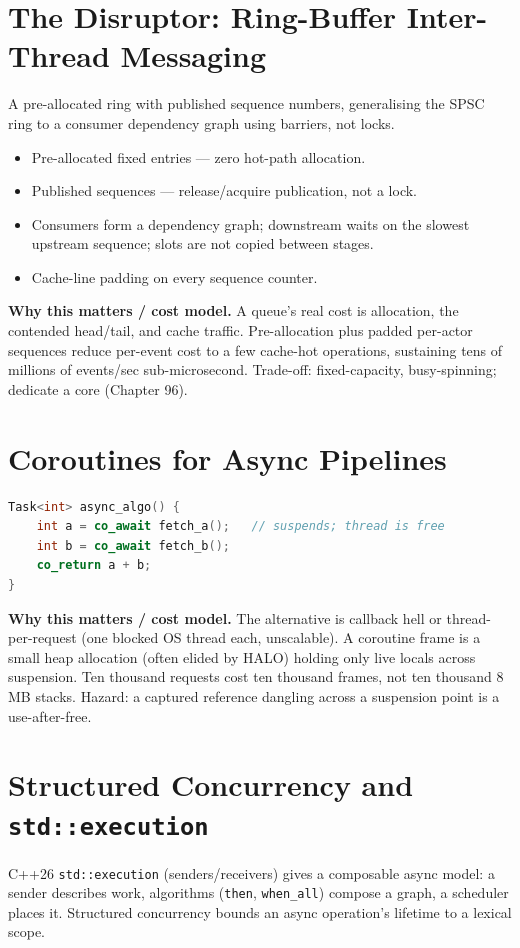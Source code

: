 \section{The Disruptor: Ring-Buffer Inter-Thread Messaging}
A pre-allocated ring with published sequence numbers, generalising the SPSC ring to a consumer dependency graph using barriers, not locks.
\begin{itemize}
\item Pre-allocated fixed entries --- zero hot-path allocation.
\item Published sequences --- release/acquire publication, not a lock.
\item Consumers form a dependency graph; downstream waits on the slowest upstream sequence; slots are not copied between stages.
\item Cache-line padding on every sequence counter.
\end{itemize}

\textbf{Why this matters / cost model.} A queue's real cost is allocation, the contended head/tail, and cache traffic. Pre-allocation plus padded per-actor sequences reduce per-event cost to a few cache-hot operations, sustaining tens of millions of events/sec sub-microsecond. Trade-off: fixed-capacity, busy-spinning; dedicate a core (Chapter 96).

\section{Coroutines for Async Pipelines}
\begin{lstlisting}[language=C++, caption={Async logic that reads like synchronous code. Min standard: C++20.}]
Task<int> async_algo() {
    int a = co_await fetch_a();   // suspends; thread is free
    int b = co_await fetch_b();
    co_return a + b;
}
\end{lstlisting}

\textbf{Why this matters / cost model.} The alternative is callback hell or thread-per-request (one blocked OS thread each, unscalable). A coroutine frame is a small heap allocation (often elided by HALO) holding only live locals across suspension. Ten thousand requests cost ten thousand frames, not ten thousand 8\,MB stacks. Hazard: a captured reference dangling across a suspension point is a use-after-free.

\section{Structured Concurrency and \texttt{std::execution}}
C++26 \texttt{std::execution} (senders/receivers) gives a composable async model: a sender describes work, algorithms (\texttt{then}, \texttt{when\_all}) compose a graph, a scheduler places it. Structured concurrency bounds an async operation's lifetime to a lexical scope.

